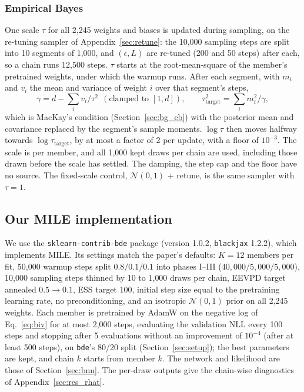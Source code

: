 \documentclass[11pt]{article}
\newcommand{\code}[1]{\texttt{#1}}
\begin{document}
\subsubsection{Empirical Bayes}
\label{sec:bnn_eb}
One scale $\tau$ for all 2{,}245 weights and biases is updated during sampling, on the re-tuning sampler of
Appendix~\ref{sec:retune}: the 10{,}000 sampling steps are split into 10 segments of 1{,}000, and $(\epsilon,L)$ are
re-tuned (200 and 50 steps) after each, so a chain runs 12{,}500 steps. $\tau$ starts at the root-mean-square of the
member's pretrained weights, under which the warmup runs. After each segment, with $m_i$ and $v_i$ the mean and
variance of weight $i$ over that segment's steps,
\begin{equation}
\label{eq:eb_block}
\gamma=d-\sum_i v_i/\tau^2\ \ (\text{clamped to }[1,d]),\qquad \tau_{\mathrm{target}}^2=\sum_i m_i^2/\gamma,
\end{equation}
which is MacKay's condition (Section~\ref{sec:bg_eb}) with the posterior mean and covariance replaced by the segment's sample
moments. $\log\tau$ then moves halfway towards $\log\tau_{\mathrm{target}}$, by at most a factor of 2 per update, with a
floor of $10^{-3}$. The scale is per member, and all 1{,}000 kept draws per chain are used, including those drawn before
the scale has settled. The damping, the step cap and the floor have no source. The fixed-scale control,
$\mathcal{N}(0,1)$ + retune, is the same sampler with $\tau=1$.

\subsection{Our MILE implementation}
\label{sec:impl}
We use the \code{sklearn-contrib-bde} package (version 1.0.2, \code{blackjax} 1.2.2), which implements MILE.
Its settings match the paper's defaults: $K=12$ members per fit, 50{,}000 warmup steps split $0.8/0.1/0.1$ into phases
I--III ($40{,}000/5{,}000/5{,}000$), 10{,}000 sampling steps thinned by 10 to 1{,}000 draws per chain, EEVPD target
annealed $0.5\to0.1$, ESS target 100, initial step size equal to the pretraining learning rate, no preconditioning, and
an isotropic $\mathcal{N}(0,1)$ prior on all 2{,}245 weights. Each member is pretrained by AdamW on the negative log of
Eq.~\eqref{eq:biv} for at most 2{,}000 steps, evaluating the validation NLL every 100 steps and stopping after 5
evaluations without an improvement of $10^{-4}$ (after at least 500 steps), on \code{bde}'s 80/20 split
(Section~\ref{sec:setup}); the best parameters are kept, and chain $k$ starts from member $k$. The network and
likelihood are those of Section~\ref{sec:bnn}. The per-draw outputs give the chain-wise diagnostics of
Appendix~\ref{sec:res_rhat}.
\end{document}

